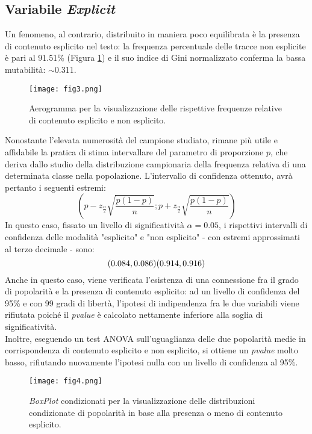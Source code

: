 \documentclass[fleqn,10pt]{SelfArx} %
\begin{document}
\subsection*{Variabile \textit{Explicit}}
Un fenomeno, al contrario, distribuito in maniera poco equilibrata è la presenza di contenuto esplicito nel testo: la frequenza percentuale delle tracce non esplicite è pari al 91.51\% (Figura \ref{fig:fig3}) e il suo indice di Gini normalizzato conferma la bassa mutabilità: $\sim$0.311. 
\begin{figure}[H]
    \centering
    \texttt{[image: fig3.png]}
    \caption{Aerogramma per la visualizzazione delle rispettive frequenze relative di contenuto esplicito e non esplicito.}
    \label{fig:fig3}
\end{figure}
Nonostante l'elevata numerosità del campione studiato, rimane più utile e affidabile la pratica di stima intervallare del parametro di proporzione $p$, che deriva dallo studio della distribuzione campionaria della frequenza relativa di una determinata classe nella popolazione. L'intervallo di confidenza ottenuto, avrà pertanto i seguenti estremi:
\begin{equation}
    (p-z_{\frac{\alpha}{2}}\sqrt{\frac{p(1-p)}{n}};p+z_{\frac{\alpha}{2}}\sqrt{\frac{p(1-p)}{n}})
\end{equation}
In questo caso, fissato un livello di significatività $\alpha=0.05$, i rispettivi intervalli di confidenza delle modalità "esplicito" e "non esplicito" - con estremi approssimati al terzo decimale - sono:
\begin{equation}
    (0.084, 0.086)\\(0.914, 0.916)
\end{equation}
Anche in questo caso, viene verificata l'esistenza di una connessione fra il grado di popolarità e la presenza di contenuto esplicito: ad un livello di confidenza del 95\% e con 99 gradi di libertà, l'ipotesi di indipendenza fra le due variabili viene rifiutata poiché il \textit{pvalue} è calcolato nettamente inferiore alla soglia di significatività.\\
Inoltre, eseguendo un test ANOVA sull'uguaglianza delle due popolarità medie in corrispondenza di contenuto esplicito e non esplicito, si ottiene un \textit{pvalue} molto basso, rifiutando nuovamente l'ipotesi nulla con un livello di confidenza al 95\%.
\begin{figure}[H]
    \centering
    \texttt{[image: fig4.png]}
    \caption{\textit{BoxPlot} condizionati per la visualizzazione delle distribuzioni condizionate di popolarità in base alla presenza o meno di contenuto esplicito.}
    \label{fig:fig4}
\end{figure}
\end{document}
